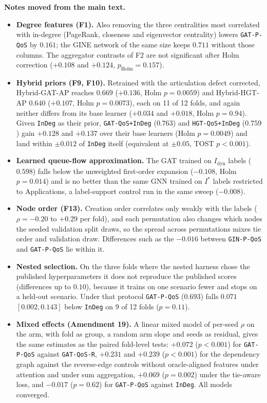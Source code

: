 \documentclass[preprint,3p]{elsarticle}
\begin{document}
\noindent\textbf{Notes moved from the main text.}
\begin{itemize}
    \item \textbf{Degree features (F1).} Also removing the three centralities most correlated with in-degree (PageRank, closeness and eigenvector centrality) lowers \texttt{GAT-P-QoS} by $0.161$; the GINE network of the same size keeps $0.711$ without those columns. The aggregator contrasts of F2 are not significant after Holm correction ($+0.108$ and $+0.124$, $p_{\text{Holm}} = 0.157$).
    \item \textbf{Hybrid priors (F9, F10).} Retrained with the articulation defect corrected, Hybrid-GAT-AP reaches $0.669$ ($+0.136$, Holm $p = 0.0059$) and Hybrid-HGT-AP $0.640$ ($+0.107$, Holm $p = 0.0073$), each on 11 of 12 folds, and again neither differs from its base learner ($+0.034$ and $+0.018$, Holm $p = 0.94$). Given \texttt{InDeg} as their prior, \texttt{GAT-QoS+InDeg} ($0.763$) and \texttt{HGT-QoS+InDeg} ($0.759$) gain $+0.128$ and $+0.137$ over their base learners (Holm $p = 0.0049$) and land within $\pm 0.012$ of \texttt{InDeg} itself (equivalent at $\pm 0.05$, TOST $p < 0.001$).
    \item \textbf{Learned queue-flow approximation.} The GAT trained on $I_{\text{dyn}}$ labels ($0.598$) falls below the unweighted first-order expansion ($-0.108$, Holm $p = 0.014$) and is no better than the same GNN trained on $I^*$ labels restricted to Applications, a label-support control run in the same sweep ($-0.008$).
    \item \textbf{Node order (F13).} Creation order correlates only weakly with the labels ($\rho = -0.20$ to $+0.29$ per fold), and each permutation also changes which nodes the seeded validation split draws, so the spread across permutations mixes tie order and validation draw. Differences such as the $-0.016$ between \texttt{GIN-P-QoS} and \texttt{GAT-P-QoS} lie within it.
    \item \textbf{Nested selection.} On the three folds where the nested harness chose the published hyperparameters it does not reproduce the published scores (differences up to $0.10$), because it trains on one scenario fewer and stops on a held-out scenario. Under that protocol \texttt{GAT-P-QoS} ($0.693$) falls $0.071$ $[0.002, 0.143]$ below \texttt{InDeg} on 9 of 12 folds ($p = 0.11$).
    \item \textbf{Mixed effects (Amendment 19).} A linear mixed model of per-seed $\rho$ on the arm, with fold as group, a random arm slope and seeds as residual, gives the same estimates as the paired fold-level tests: $+0.072$ ($p < 0.001$) for \texttt{GAT-P-QoS} against \texttt{GAT-QoS-R}, $+0.231$ and $+0.239$ ($p < 0.001$) for the dependency graph against the reverse-edge controls without oracle-aligned features under attention and under sum aggregation, $+0.069$ ($p = 0.002$) under the tie-aware loss, and $-0.017$ ($p = 0.62$) for \texttt{GAT-P-QoS} against \texttt{InDeg}. All models converged.

\end{itemize}
\end{document}
